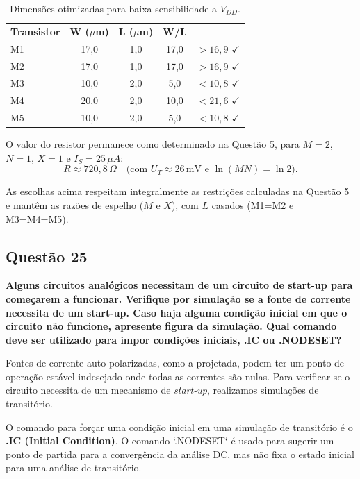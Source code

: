 ﻿\documentclass[12pt,a4paper]{article}
\begin{document}
\begin{table}[H]
\centering
\caption{Dimensões otimizadas para baixa sensibilidade a $V_{DD}$.}
\label{tab:dimensoes_otimizadas}
\begin{tabular}{@{}lcccc@{}}
\toprule
\textbf{Transistor} & \textbf{W ($\mu$m)} & \textbf{L ($\mu$m)} & \textbf{W/L} \\
M1 & 17,0 & 1,0 & 17,0 & $> 16,9$ $\checkmark$ \\
M2 & 17,0 & 1,0 & 17,0 & $> 16,9$ $\checkmark$ \\
M3 & 10,0 & 2,0 & 5,0 & $< 10,8$ $\checkmark$ \\
M4 & 20,0 & 2,0 & 10,0 & $< 21,6$ $\checkmark$ \\
M5 & 10,0 & 2,0 & 5,0 & $< 10,8$ $\checkmark$ \\
\bottomrule
\bottomrule
\end{tabular}
\end{table}
O valor do resistor permanece como determinado na Questão 5, para $M=2$, $N=1$, $X=1$ e $I_S=25\,\mu A$:
$$ R \approx 720{,}8\,\Omega \quad \text{(com } U_T \approx 26\,\text{mV e }\ln(MN)=\ln 2\text{)}. $$

As escolhas acima respeitam integralmente as restrições calculadas na Questão 5 e mantêm as razões de espelho ($M$ e $X$), com $L$ casados (M1=M2 e M3=M4=M5).
\subsection*{Questão 25}

\textbf{Alguns circuitos analógicos necessitam de um circuito de start-up para começarem a funcionar. Verifique por simulação se a fonte de corrente necessita de um start-up. Caso haja alguma condição inicial em que o circuito não funcione, apresente figura da simulação. Qual comando deve ser utilizado para impor condições iniciais, .IC ou .NODESET?}

Fontes de corrente auto-polarizadas, como a projetada, podem ter um ponto de operação estável indesejado onde todas as correntes são nulas. Para verificar se o circuito necessita de um mecanismo de \textit{start-up}, realizamos simulações de transitório.

O comando para forçar uma condição inicial em uma simulação de transitório é o \textbf{.IC (Initial Condition)}. O comando `.NODESET` é usado para sugerir um ponto de partida para a convergência da análise DC, mas não fixa o estado inicial para uma análise de transitório.
\end{document}
